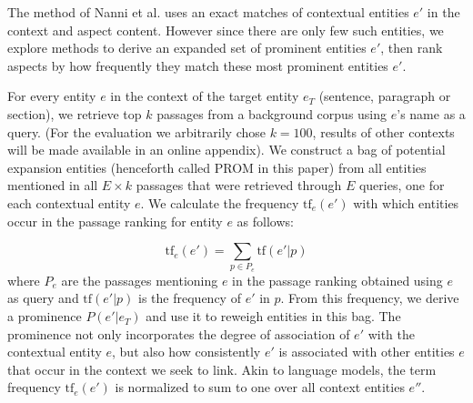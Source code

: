     

The method of Nanni et al. uses an exact matches of contextual entities $e'$ in the context and aspect content. However since there are only few such entities, we explore methods to derive an expanded set of prominent entities $e'$, then rank aspects by how frequently they match these most prominent entities $e'$. 

For every entity $e$ in the context of the target entity $e_T$ (sentence, paragraph or section), we retrieve top $k$ passages from a background corpus using $e$'s name as a query. (For the evaluation we arbitrarily chose $k=100$, results of other contexts will be made available in an online appendix). We construct a bag of potential expansion entities (henceforth called PROM in this paper) from all entities mentioned in all $E \times k$ passages that were retrieved through $E$ queries, one for each contextual entity $e$. We calculate the frequency $\text{tf}_{e}(e')$ with which entities occur in the passage ranking for entity $e$ as follows:

\begin{equation}
\label{eq:frequency-of-co-occurring-ent}
    \text{tf}_{e}(e')=\sum_{p\in P_e}\text{tf}(e'\vert p)
\end{equation}
where $P_e$ are the passages mentioning $e$ in the passage ranking obtained using $e$ as query and $\text{tf}(e'\vert p)$ is the frequency of $e'$ in $p$.
%
From this frequency, we derive a prominence $P(e'\vert e_T)$ and use it to reweigh entities in this bag. The prominence not only incorporates the degree of association of $e'$ with the contextual entity $e$, but also how consistently $e'$ is associated with other entities $e$ that occur in the context we seek to link. Akin to language models, the term frequency $\text{tf}_{e}(e')$ is normalized to sum to one over all context entities $e''$.

